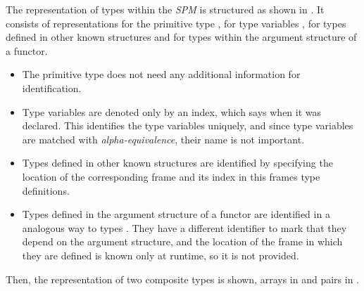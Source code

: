 The representation of types within the \emph{SPM} is structured as shown in .
It consists of representations for the primitive type , for type variables , for types defined in other known structures and for types within the argument structure of a functor.
\begin{itemize}
\item The primitive type  does not need any additional information for identification.
\item Type variables  are denoted only by an index, which says when it was declared. 
This identifies the type variables uniquely, and since type variables are matched with \emph{alpha-equivalence}, their name is not important.
\item Types  defined in other known structures  are identified by specifying the location of the corresponding frame  and its index in this frames type definitions.
\item Types  defined in the argument structure of a functor are identified in a analogous way to types . 
They have a different identifier to mark that they depend on the argument structure, and the location of the frame in which they are defined is known only at runtime, so it is not provided.
\end{itemize}
Then, the representation of two composite types is shown, arrays \lsttext{[]} in  and pairs \lsttext{(,)} in .

